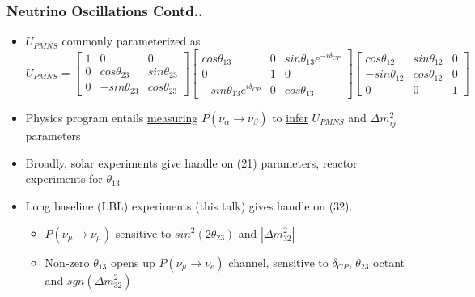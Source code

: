 \documentclass[9pt, aspectratio=169]{beamer}
\begin{document}
\begin{frame}
  \frametitle{Neutrino Oscillations Contd..}
  \begin{itemize}
    \item $U_{PMNS}$ commonly parameterized as 
      \begin{equation*}
        U_{PMNS}=
      \begin{bmatrix}
        1 & 0 & 0 \\
        0 & cos\theta_{23} & sin\theta_{23} \\
        0 & -sin\theta_{23} & cos\theta_{23} 
      \end{bmatrix}
      \begin{bmatrix}
        cos\theta_{13} & 0 & sin\theta_{13}e^{-i\delta_{CP}} \\
        0 & 1 & 0 \\
        -sin\theta_{13}e^{i\delta_{CP}} & 0 & cos\theta_{13} 
      \end{bmatrix}
      \begin{bmatrix}
        cos\theta_{12} & sin\theta_{12} & 0 \\
        -sin\theta_{12} & cos\theta_{12} & 0 \\
        0 & 0 & 1
      \end{bmatrix}
      \end{equation*}
    \item Physics program entails \underline{measuring} $P(\nu_{\alpha} \rightarrow \nu_{\beta})$ to \underline{infer} $U_{PMNS}$ and $\Delta m^2_{ij}$ parameters
    \item Broadly, solar experiments give handle on (21) parameters, reactor experiments for $\theta_{13}$
      \bigskip
    \item Long baseline (LBL) experiments (this talk) gives handle on (32).
      \begin{itemize}
        \item $P(\nu_{\mu} \rightarrow \nu_{\mu})$ sensitive to $sin^{2}(2\theta_{23})$ and $|\Delta m^2_{32}|$
        \item Non-zero $\theta_{13}$ opens up $P(\nu_{\mu} \rightarrow \nu_{e})$ channel, sensitive to $\delta_{CP}$, $\theta_{23}$ octant and $sgn(\Delta m^2_{32})$
      \end{itemize}
  \end{itemize}
\end{frame}
\end{document}

